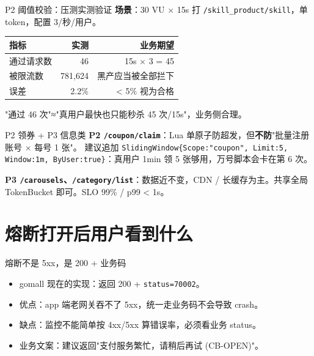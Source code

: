 \begin{frame}{P2 阈值校验：压测实测验证}
\textbf{场景}：30 VU $\times$ 15s 打 \texttt{/skill\_product/skill}，单 token，配置 3/秒/用户。

\vspace{2mm}
\begin{tabular}{@{}lrr@{}}
\toprule
指标 & 实测 & 业务期望 \\
\midrule
通过请求数 & 46  & 15s $\times$ 3 = 45 \\
被限流数   & 781{,}624 & 黑产应当被全部拦下 \\
误差       & 2.2\% & < 5\% 视为合格 \\
\bottomrule
\end{tabular}
\vspace{3mm}
\small "通过 46 次"≈"真用户最快也只能秒杀 45 次/15s"，业务侧合理。
\end{frame}

\begin{frame}{P2 领券 + P3 信息类}
\textbf{P2 \texttt{/coupon/claim}}：Lua 单原子防超发，但\textbf{不防}"批量注册账号 $\times$ 每号 1 张"。
建议追加 \texttt{SlidingWindow\{Scope:"coupon", Limit:5, Window:1m, ByUser:true\}}：真用户 1min 领 5 张够用，万号脚本会卡在第 6 次。

\vspace{2mm}
\textbf{P3 \texttt{/carousels}、\texttt{/category/list}}：数据近不变，CDN / 长缓存为主。共享全局 TokenBucket 即可。SLO 99\% / p99 < 1s。
\end{frame}

\section{熔断打开后用户看到什么}

\begin{frame}{熔断不是 5xx，是 200 + 业务码}
\begin{itemize}
  \item gomall 现在的实现：返回 200 + \texttt{status=70002}。
  \item 优点：app 端老网关吞不了 5xx，统一走业务码不会导致 crash。
  \item 缺点：监控不能简单按 4xx/5xx 算错误率，必须看业务 status。
  \item 业务文案：建议返回"支付服务繁忙，请稍后再试 (CB-OPEN)"。
\end{itemize}
\end{frame}

